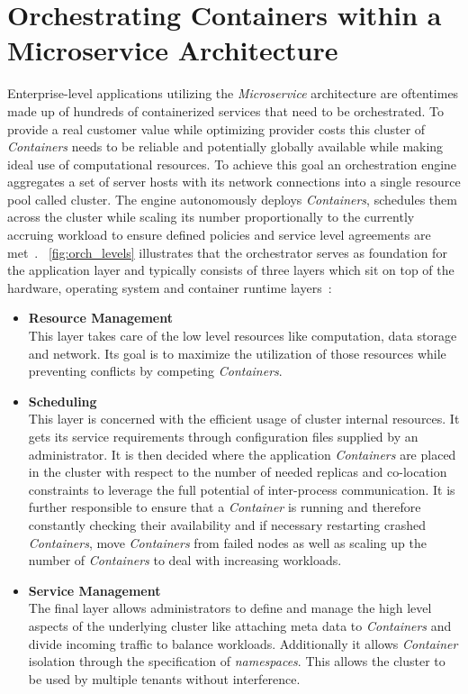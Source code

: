 \section{Orchestrating Containers within a Microservice Architecture}
Enterprise-level applications utilizing the \textit{Microservice} architecture are oftentimes made up of hundreds of containerized services that need to be orchestrated.
To provide a real customer value while optimizing provider costs this cluster of \textit{Containers} needs to be reliable and potentially globally available while making ideal use of computational resources.
To achieve this goal an orchestration engine aggregates a set of server hosts with its network connections into a single resource pool called cluster.
The engine autonomously deploys \textit{Containers}, schedules them across the cluster while scaling its number proportionally to the currently accruing workload to ensure defined policies and service level agreements are met~\cite{Microservices2, Orch1}.
~\cref{fig:orch_levels} illustrates that the orchestrator serves as foundation for the application layer and typically consists of three layers which sit on top of the hardware, operating system and container runtime layers~\cite{Orch2}:
\begin{itemize}
    \item[]{\textbf{Resource Management}\\
    This layer takes care of the low level resources like computation, data storage and network.
    Its goal is to maximize the utilization of those resources while preventing conflicts by competing \textit{Containers}.
    }
    \item[]{\textbf{Scheduling}\\
    This layer is concerned with the efficient usage of cluster internal resources. 
    It gets its service requirements through configuration files supplied by an administrator.
    It is then decided where the application \textit{Containers} are placed in the cluster with respect to the number of needed replicas and co-location constraints to leverage the full potential of inter-process communication.
    It is further responsible to ensure that a \textit{Container} is running and therefore constantly checking their availability and if necessary restarting crashed \textit{Containers}, move \textit{Containers} from failed nodes as well as scaling up the number of \textit{Containers} to deal with increasing workloads.
    }
    \item[]{\textbf{Service Management}\\
    The final layer allows administrators to define and manage the high level aspects of the underlying cluster like attaching meta data to \textit{Containers} and divide incoming traffic to balance workloads.
    Additionally it allows \textit{Container} isolation through the specification of \textit{namespaces}.
    This allows the cluster to be used by multiple tenants without interference.
    }
\end{itemize}
